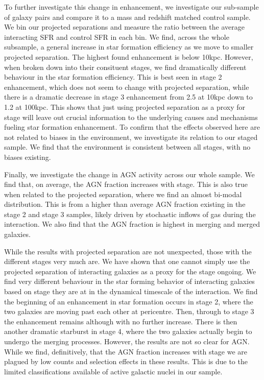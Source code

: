 \documentclass[fleqn,usenatbib]{mnras}
\begin{document}
To further investigate this change in enhancement, we investigate our sub-sample of galaxy pairs and compare it to a mass and redshift matched control sample. We bin our projected separations and measure the ratio between the average interacting SFR and control SFR in each bin. We find, across the whole subsample, a general increase in star formation efficiency as we move to smaller projected separation. The highest found enhancement is below 10kpc. However, when broken down into their consituent stages, we find dramatically different behaviour in the star formation efficiency. This is best seen in stage 2 enhancement, which does not seem to change with projected separation, while there is a dramatic decrease in stage 3 enhancement from 2.5 at 10kpc down to 1.2 at 100kpc. This shows that just using projected separation as a proxy for stage will leave out crucial information to the underlying causes and mechanisms fueling star formation enhancement. To confirm that the effects observed here are not related to biases in the environment, we investigate its relation to our staged sample. We find that the environment is consistent between all stages, with no biases existing.

Finally, we investigate the change in AGN activity across our whole sample. We find that, on average, the AGN fraction increases with stage. This is also true when related to the projected separation, where we find an almost bi-modal distribution. This is from a higher than average AGN fraction existing in the stage 2 and stage 3 samples, likely driven by stochastic inflows of gas during the interaction. We also find that the AGN fraction is highest in merging and merged galaxies.

While the results with projected separation are not unexpected, those with the different stages very much are. We have shown that one cannot simply use the projected separation of interacting galaxies as a proxy for the stage ongoing. We find very different behaviour in the star forming behavior of interacting galaxies based on stage they are at in the dynamical timescale of the interaction. We find the beginning of an enhancement in star formation occurs in stage 2, where the two galaxies are moving past each other at pericentre. Then, through to stage 3 the enhancement remains although with no further increase. There is then another dramatic starburst in stage 4, where the two galaxies actually begin to undergo the merging processes. However, the results are not so clear for AGN. While we find, definitively, that the AGN fraction increases with stage we are plagued by low counts and selection effects in these results. This is due to the limited classifications available of active galactic nuclei in our sample.
\end{document}
